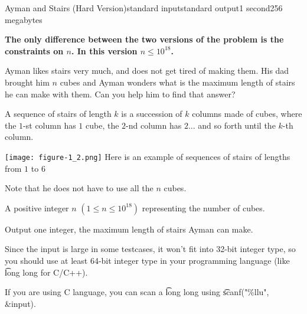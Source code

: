 \begin{problem}{Ayman and Stairs (Hard Version)}{standard input}{standard output}{1 second}{256 megabytes}

\textbf{The only difference between the two versions of the problem is the constraints on $n$. In this version $n \leq 10^{18}$.}

Ayman likes stairs very much, and does not get tired of making them. His dad brought him $n$ cubes and Ayman wonders what is the maximum length of stairs he can make with them. Can you help him to find that answer?

A sequence of stairs of length $k$ is a succession of $k$ columns made of cubes, where the $1$-st column has $1$ cube, the $2$-nd column has $2$... and so forth until the $k$-th column.

\begin{center}
\texttt{[image: figure-1\_2.png]}
\small{Here is an example of sequences of stairs of lengths from $1$ to $6$}
\end{center}

Note that he does not have to use all the $n$ cubes.

\InputFile
A positive integer $n$ $(1 \leq n \leq 10^{18})$ representing the number of cubes.

\OutputFile
Output one integer, the maximum length of stairs Ayman can make.

\Examples

\begin{example}
%
%
%
\end{example}

\Note
Since the input is large in some testcases, it won't fit into 32-bit integer type, so you should use at least 64-bit integer type in your programming language (like \t{long long} for C/C++).

If you are using C language, you can scan a \t{long long} using \t{scanf("\%llu", &input)}.

\end{problem}

